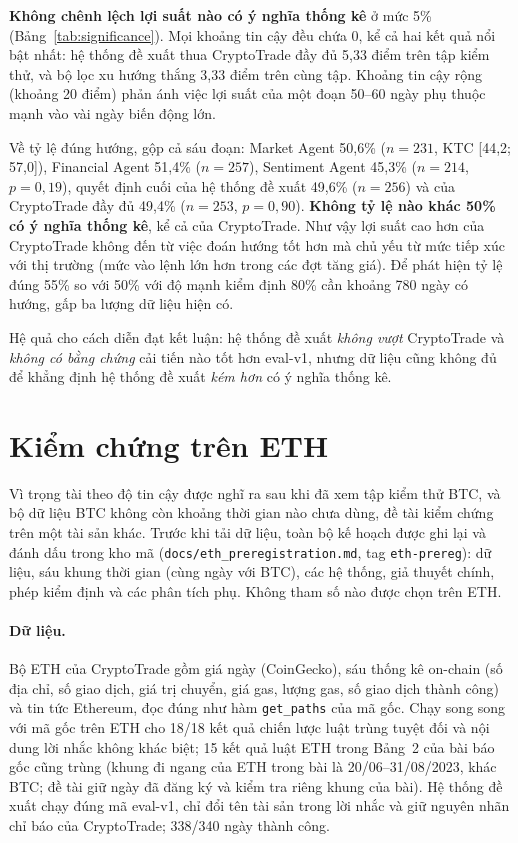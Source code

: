 \textbf{Không chênh lệch lợi suất nào có ý nghĩa thống kê} ở mức 5\% (Bảng~\ref{tab:significance}). Mọi khoảng tin cậy
đều chứa 0, kể cả hai kết quả nổi bật nhất: hệ thống đề xuất thua CryptoTrade đầy đủ 5,33 điểm trên tập kiểm thử, và
bộ lọc xu hướng thắng 3,33 điểm trên cùng tập. Khoảng tin cậy rộng (khoảng 20 điểm) phản ánh việc lợi suất của một đoạn
50--60 ngày phụ thuộc mạnh vào vài ngày biến động lớn.

Về tỷ lệ đúng hướng, gộp cả sáu đoạn: Market Agent 50,6\% ($n=231$, KTC [44,2; 57,0]), Financial Agent 51,4\% ($n=257$),
Sentiment Agent 45,3\% ($n=214$, $p=0{,}19$), quyết định cuối của hệ thống đề xuất 49,6\% ($n=256$) và của CryptoTrade
đầy đủ 49,4\% ($n=253$, $p=0{,}90$). \textbf{Không tỷ lệ nào khác 50\% có ý nghĩa thống kê}, kể cả của CryptoTrade.
Như vậy lợi suất cao hơn của CryptoTrade không đến từ việc đoán hướng tốt hơn mà chủ yếu từ mức tiếp xúc với thị trường
(mức vào lệnh lớn hơn trong các đợt tăng giá). Để phát hiện tỷ lệ đúng 55\% so với 50\% với độ mạnh kiểm định 80\%
cần khoảng 780 ngày có hướng, gấp ba lượng dữ liệu hiện có.

Hệ quả cho cách diễn đạt kết luận: hệ thống đề xuất \emph{không vượt} CryptoTrade và \emph{không có bằng chứng} cải
tiến nào tốt hơn eval-v1, nhưng dữ liệu cũng không đủ để khẳng định hệ thống đề xuất \emph{kém hơn} có ý nghĩa thống kê.

\section{Kiểm chứng trên ETH}
\label{sec:eth}
Vì trọng tài theo độ tin cậy được nghĩ ra sau khi đã xem tập kiểm thử BTC, và bộ dữ liệu BTC không còn khoảng thời gian
nào chưa dùng, đề tài kiểm chứng trên một tài sản khác. Trước khi tải dữ liệu, toàn bộ kế hoạch được ghi lại và đánh dấu
trong kho mã (\texttt{docs/eth\_preregistration.md}, tag \texttt{eth-prereg}): dữ liệu, sáu khung thời gian (cùng ngày với
BTC), các hệ thống, giả thuyết chính, phép kiểm định và các phân tích phụ. Không tham số nào được chọn trên ETH.

\paragraph{Dữ liệu.} Bộ ETH của CryptoTrade gồm giá ngày (CoinGecko), sáu thống kê on-chain (số địa chỉ, số giao dịch,
giá trị chuyển, giá gas, lượng gas, số giao dịch thành công) và tin tức Ethereum, đọc đúng như hàm \texttt{get\_paths}
của mã gốc. Chạy song song với mã gốc trên ETH cho 18/18 kết quả chiến lược luật trùng tuyệt đối và nội dung lời nhắc
không khác biệt; 15 kết quả luật ETH trong Bảng~2 của bài báo gốc cũng trùng (khung đi ngang của ETH trong bài là
20/06--31/08/2023, khác BTC; đề tài giữ ngày đã đăng ký và kiểm tra riêng khung của bài). Hệ thống đề xuất chạy đúng mã
eval-v1, chỉ đổi tên tài sản trong lời nhắc và giữ nguyên nhãn chỉ báo của CryptoTrade; 338/340 ngày thành công.

